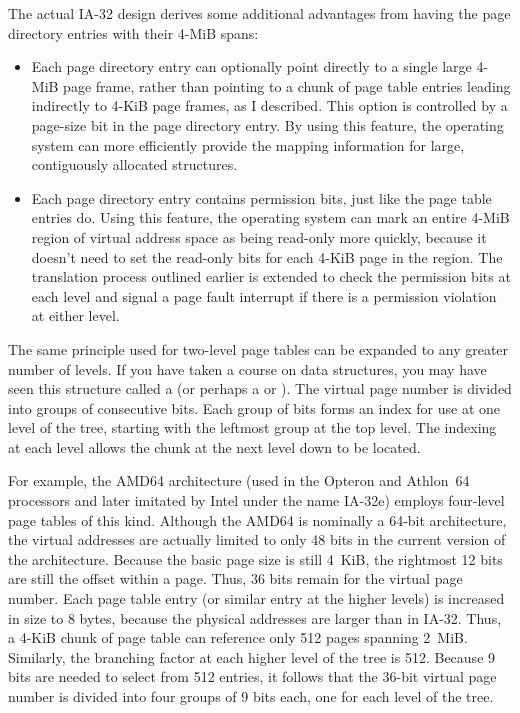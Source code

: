 The
actual IA-32 design derives some additional advantages from having the page
directory entries with their 4-MiB spans:
\begin{itemize}
\item
Each page directory entry can optionally point directly to a single
large 4-MiB page frame, rather than pointing to a chunk of page table
entries leading indirectly to 4-KiB page frames, as I described.  This
option is controlled by a page-size bit in the page directory entry.
By using this feature, the operating system can more efficiently
provide the mapping information for large, contiguously allocated
structures.
\item
Each page directory entry contains permission bits, just like the page
table entries do.  Using this feature, the operating system can mark
an entire 4-MiB region of virtual address space as being read-only
more quickly, because it doesn't need to set the read-only bits
for each 4-KiB page in the region.  The translation process
outlined earlier is extended to check the permission bits at each
level and signal a page fault interrupt if there is a permission
violation at either level.
\end{itemize}

The same principle used for two-level page tables can be expanded to
any greater number of levels.  If you have taken a course on data
structures, you may have seen this structure called a  (or
perhaps a  or ).  The
virtual page number is divided into groups of consecutive bits.  Each
group of bits forms an index for use at one level of the tree,
starting with the leftmost group at the top level.  The indexing at
each level allows the chunk at the next level down to be located.

For example, the AMD64 architecture (used in the Opteron and Athlon~64
processors and later imitated by Intel under the name IA-32e) employs
four-level page tables of this kind.  Although the AMD64 is nominally
a 64-bit architecture, the virtual addresses are actually limited to
only 48 bits in the current version of the architecture.  Because the
basic page size is still 4~KiB, the rightmost 12 bits are still the
offset within a page.  Thus, 36 bits remain for the virtual page
number.  Each page table entry (or similar entry at the higher levels)
is increased in size to 8 bytes, because the physical addresses
are larger than in IA-32.  Thus, a 4-KiB chunk of page table can reference
only 512 pages spanning 2~MiB.  Similarly, the branching factor
at each higher level of the tree is 512.  Because 9 bits are needed
to select from 512 entries, it follows that the 36-bit virtual page
number is divided into four groups of 9 bits each, one for each
level of the tree.

